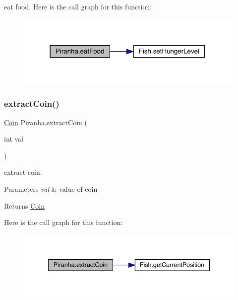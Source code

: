 eat food. Here is the call graph for this function\+:
\nopagebreak
\begin{figure}[H]
\begin{center}
\leavevmode
\includegraphics[width=314pt]{class_piranha_a9310ca27aa9c8fdec55f03ef4fa994e0_cgraph}
\end{center}
\end{figure}
\mbox{\label{class_piranha_a2cf10bd7477bf06d0f5020411acfe95d}} 
\subsubsection{\texorpdfstring{extract\+Coin()}{extractCoin()}}
{\footnotesize\ttfamily \mbox{\hyperlink{class_coin}{Coin}} Piranha.\+extract\+Coin (\begin{DoxyParamCaption}\item[{int}]{val }\end{DoxyParamCaption})\hspace{0.3cm}{\ttfamily [inline]}}

extract coin. 
\begin{DoxyParams}{Parameters}
{\em val} & value of coin \\
\hline
\end{DoxyParams}
\begin{DoxyReturn}{Returns}
\mbox{\hyperlink{class_coin}{Coin}} 
\end{DoxyReturn}
Here is the call graph for this function\+:
\nopagebreak
\begin{figure}[H]
\begin{center}
\leavevmode
\includegraphics[width=340pt]{class_piranha_a2cf10bd7477bf06d0f5020411acfe95d_cgraph}
\end{center}
\end{figure}


